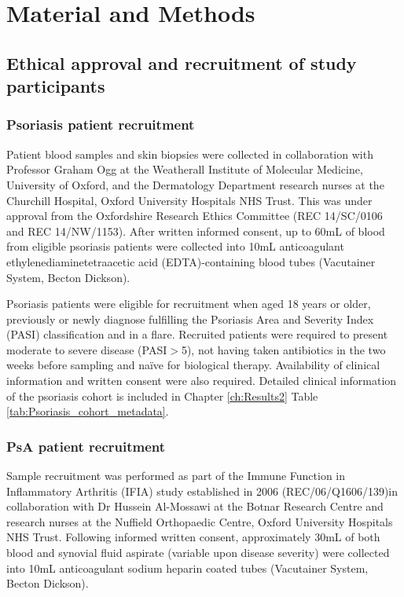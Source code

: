 \chapter{Material and Methods}
\label{ch:Mat}



\section{Ethical approval and recruitment of study participants}

\subsection{Psoriasis patient recruitment}

Patient blood samples and skin biopsies were collected in collaboration with Professor Graham Ogg at the Weatherall Institute of Molecular Medicine, University of Oxford, and the Dermatology Department research nurses at the Churchill Hospital, Oxford University Hospitals NHS Trust. This was under approval from the Oxfordshire Research Ethics Committee (REC 14/SC/0106 and REC 14/NW/1153). After written informed consent, up to 60mL of blood from eligible psoriasis patients were collected into 10mL anticoagulant ethylenediaminetetraacetic acid (EDTA)-containing blood tubes (Vacutainer System, Becton Dickson).

Psoriasis patients were eligible for recruitment when aged 18 years or older, previously or newly diagnose fulfilling the Psoriasis Area and Severity Index (PASI) classification and in a flare. Recruited patients were required to present moderate to severe disease (PASI$>$5), not having taken antibiotics in the two weeks before sampling and na\"{i}ve for biological therapy. Availability of clinical information and written consent were also required. Detailed clinical information of the psoriasis cohort is included in Chapter \ref{ch:Results2} Table \ref{tab:Psoriasis_cohort_metadata}.



\subsection{PsA patient recruitment}

Sample recruitment was performed as part of the Immune Function in Inflammatory Arthritis (IFIA) study established in 2006 (REC/06/Q1606/139)in collaboration with Dr Hussein Al-Mossawi at the Botnar Research Centre and research nurses at the Nuffield Orthopaedic Centre, Oxford University Hospitals NHS Trust. Following informed written consent, approximately 30mL of both blood and synovial fluid aspirate (variable upon disease severity) were collected into 10mL anticoagulant sodium heparin coated tubes (Vacutainer System, Becton Dickson).

